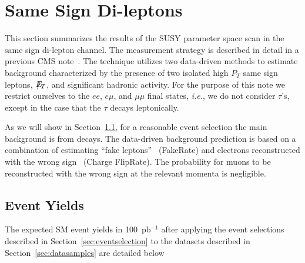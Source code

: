 \section{Same Sign Di-leptons}
\label{sec:samesign}

This section summarizes the results of the SUSY parameter space scan
in the same sign di-lepton channel. The measurement strategy is  
described in detail in a previous CMS note~\cite{ssnote}. The technique
utilizes two data-driven methods to estimate background characterized
by the presence of two isolated high $P_T$ same sign leptons,
$E\!\!\!\!/_T$, and significant hadronic activity.  For the purpose 
of this note we restrict ourselves to the $ee$, $e\mu$, and $\mu\mu$
final states, {\em i.e.}, we do not consider $\tau$'s, except in the
case that the $\tau$ decays leptonically. 

As we will show in Section~\ref{sec:ssyields}, for a reasonable event
selection the main background is from \ttbar decays. The data-driven background 
prediction is based on a combination of estimating ``fake leptons''~\cite{fakenote} (FakeRate) 
and electrons reconstructed with the wrong sign~\cite{ssnote} (Charge FlipRate). The probability
for muons to be reconstructed with the wrong sign at the relevant momenta is negligible.

\subsection{Event Yields}
\label{sec:ssyields}

The expected SM event yields in 100~pb$^{-1}$ after applying the event selections
described in Section~\ref{sec:eventselection} to the datasets described in
Section~\ref{sec:datasamples} are detailed below

